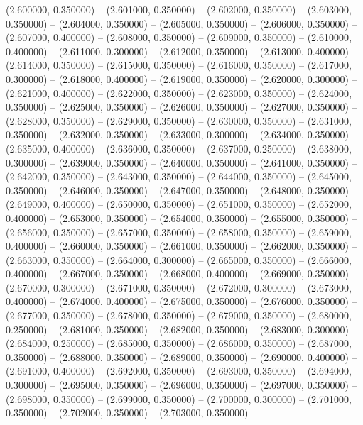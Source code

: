 (2.600000, 0.350000) -- 
(2.601000, 0.350000) -- 
(2.602000, 0.350000) -- 
(2.603000, 0.350000) -- 
(2.604000, 0.350000) -- 
(2.605000, 0.350000) -- 
(2.606000, 0.350000) -- 
(2.607000, 0.400000) -- 
(2.608000, 0.350000) -- 
(2.609000, 0.350000) -- 
(2.610000, 0.400000) -- 
(2.611000, 0.300000) -- 
(2.612000, 0.350000) -- 
(2.613000, 0.400000) -- 
(2.614000, 0.350000) -- 
(2.615000, 0.350000) -- 
(2.616000, 0.350000) -- 
(2.617000, 0.300000) -- 
(2.618000, 0.400000) -- 
(2.619000, 0.350000) -- 
(2.620000, 0.300000) -- 
(2.621000, 0.400000) -- 
(2.622000, 0.350000) -- 
(2.623000, 0.350000) -- 
(2.624000, 0.350000) -- 
(2.625000, 0.350000) -- 
(2.626000, 0.350000) -- 
(2.627000, 0.350000) -- 
(2.628000, 0.350000) -- 
(2.629000, 0.350000) -- 
(2.630000, 0.350000) -- 
(2.631000, 0.350000) -- 
(2.632000, 0.350000) -- 
(2.633000, 0.300000) -- 
(2.634000, 0.350000) -- 
(2.635000, 0.400000) -- 
(2.636000, 0.350000) -- 
(2.637000, 0.250000) -- 
(2.638000, 0.300000) -- 
(2.639000, 0.350000) -- 
(2.640000, 0.350000) -- 
(2.641000, 0.350000) -- 
(2.642000, 0.350000) -- 
(2.643000, 0.350000) -- 
(2.644000, 0.350000) -- 
(2.645000, 0.350000) -- 
(2.646000, 0.350000) -- 
(2.647000, 0.350000) -- 
(2.648000, 0.350000) -- 
(2.649000, 0.400000) -- 
(2.650000, 0.350000) -- 
(2.651000, 0.350000) -- 
(2.652000, 0.400000) -- 
(2.653000, 0.350000) -- 
(2.654000, 0.350000) -- 
(2.655000, 0.350000) -- 
(2.656000, 0.350000) -- 
(2.657000, 0.350000) -- 
(2.658000, 0.350000) -- 
(2.659000, 0.400000) -- 
(2.660000, 0.350000) -- 
(2.661000, 0.350000) -- 
(2.662000, 0.350000) -- 
(2.663000, 0.350000) -- 
(2.664000, 0.300000) -- 
(2.665000, 0.350000) -- 
(2.666000, 0.400000) -- 
(2.667000, 0.350000) -- 
(2.668000, 0.400000) -- 
(2.669000, 0.350000) -- 
(2.670000, 0.300000) -- 
(2.671000, 0.350000) -- 
(2.672000, 0.300000) -- 
(2.673000, 0.400000) -- 
(2.674000, 0.400000) -- 
(2.675000, 0.350000) -- 
(2.676000, 0.350000) -- 
(2.677000, 0.350000) -- 
(2.678000, 0.350000) -- 
(2.679000, 0.350000) -- 
(2.680000, 0.250000) -- 
(2.681000, 0.350000) -- 
(2.682000, 0.350000) -- 
(2.683000, 0.300000) -- 
(2.684000, 0.250000) -- 
(2.685000, 0.350000) -- 
(2.686000, 0.350000) -- 
(2.687000, 0.350000) -- 
(2.688000, 0.350000) -- 
(2.689000, 0.350000) -- 
(2.690000, 0.400000) -- 
(2.691000, 0.400000) -- 
(2.692000, 0.350000) -- 
(2.693000, 0.350000) -- 
(2.694000, 0.300000) -- 
(2.695000, 0.350000) -- 
(2.696000, 0.350000) -- 
(2.697000, 0.350000) -- 
(2.698000, 0.350000) -- 
(2.699000, 0.350000) -- 
(2.700000, 0.300000) -- 
(2.701000, 0.350000) -- 
(2.702000, 0.350000) -- 
(2.703000, 0.350000) -- 
